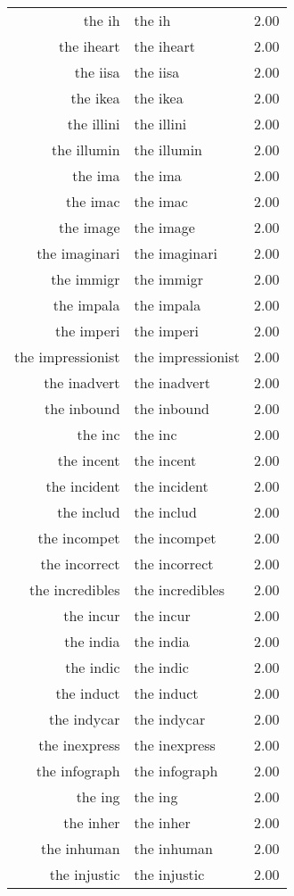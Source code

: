 \begin{table}[ht]
\begin{tabular}{rlr}
  the ih & the ih & 2.00 \\ 
  the iheart & the iheart & 2.00 \\ 
  the iisa & the iisa & 2.00 \\ 
  the ikea & the ikea & 2.00 \\ 
  the illini & the illini & 2.00 \\ 
  the illumin & the illumin & 2.00 \\ 
  the ima & the ima & 2.00 \\ 
  the imac & the imac & 2.00 \\ 
  the image & the image & 2.00 \\ 
  the imaginari & the imaginari & 2.00 \\ 
  the immigr & the immigr & 2.00 \\ 
  the impala & the impala & 2.00 \\ 
  the imperi & the imperi & 2.00 \\ 
  the impressionist & the impressionist & 2.00 \\ 
  the inadvert & the inadvert & 2.00 \\ 
  the inbound & the inbound & 2.00 \\ 
  the inc & the inc & 2.00 \\ 
  the incent & the incent & 2.00 \\ 
  the incident & the incident & 2.00 \\ 
  the includ & the includ & 2.00 \\ 
  the incompet & the incompet & 2.00 \\ 
  the incorrect & the incorrect & 2.00 \\ 
  the incredibles & the incredibles & 2.00 \\ 
  the incur & the incur & 2.00 \\ 
  the india & the india & 2.00 \\ 
  the indic & the indic & 2.00 \\ 
  the induct & the induct & 2.00 \\ 
  the indycar & the indycar & 2.00 \\ 
  the inexpress & the inexpress & 2.00 \\ 
  the infograph & the infograph & 2.00 \\ 
  the ing & the ing & 2.00 \\ 
  the inher & the inher & 2.00 \\ 
  the inhuman & the inhuman & 2.00 \\ 
  the injustic & the injustic & 2.00 \\ 

\end{tabular}
\end{table}
